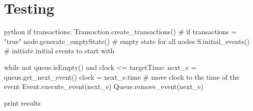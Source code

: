 \documentclass{article}
\begin{document}
    \section{Testing}

    \lipsum[5]

    \begin{mintedbox}{python}
if transactions:
    Transaction.create_transactions() # if transactions = "true"
    node.generate_emptyState() # empty state for all nodes
    S.initial_events() # initiate initial events to start with

while not queue.isEmpty() and clock <= targetTime:
    next_e = queue.get_next_event()
    clock = next_e.time # move clock to the time of the event
    Event.execute_event(next_e)
    Queue.remove_event(next_e)

print results
    \end{mintedbox}

    \lipsum[2]
\end{document}
